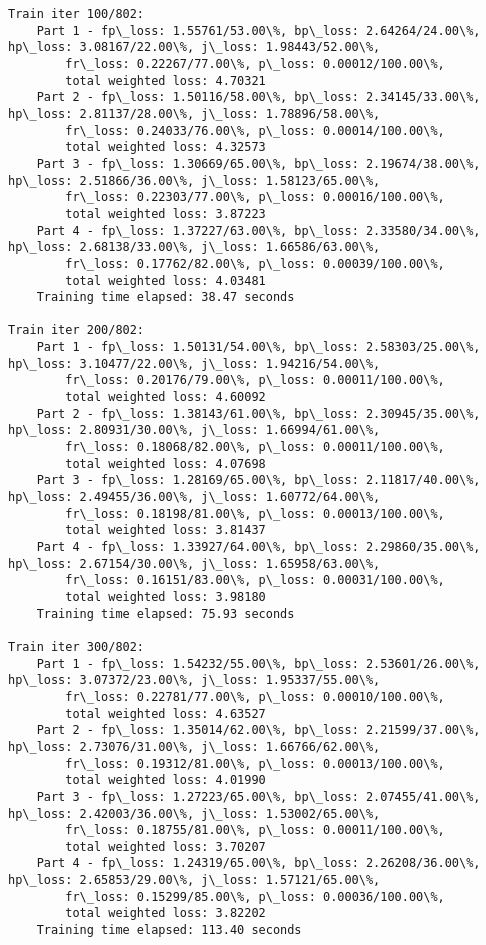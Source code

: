 \documentclass[11pt]{article}
\begin{document}
\begin{Verbatim}[commandchars=\\\{\}]
Train iter 100/802:
	Part 1 - fp\_loss: 1.55761/53.00\%, bp\_loss: 2.64264/24.00\%, hp\_loss: 3.08167/22.00\%, j\_loss: 1.98443/52.00\%, 
		fr\_loss: 0.22267/77.00\%, p\_loss: 0.00012/100.00\%, 
		total weighted loss: 4.70321
	Part 2 - fp\_loss: 1.50116/58.00\%, bp\_loss: 2.34145/33.00\%, hp\_loss: 2.81137/28.00\%, j\_loss: 1.78896/58.00\%, 
		fr\_loss: 0.24033/76.00\%, p\_loss: 0.00014/100.00\%, 
		total weighted loss: 4.32573
	Part 3 - fp\_loss: 1.30669/65.00\%, bp\_loss: 2.19674/38.00\%, hp\_loss: 2.51866/36.00\%, j\_loss: 1.58123/65.00\%, 
		fr\_loss: 0.22303/77.00\%, p\_loss: 0.00016/100.00\%, 
		total weighted loss: 3.87223
	Part 4 - fp\_loss: 1.37227/63.00\%, bp\_loss: 2.33580/34.00\%, hp\_loss: 2.68138/33.00\%, j\_loss: 1.66586/63.00\%, 
		fr\_loss: 0.17762/82.00\%, p\_loss: 0.00039/100.00\%, 
		total weighted loss: 4.03481
	Training time elapsed: 38.47 seconds

Train iter 200/802:
	Part 1 - fp\_loss: 1.50131/54.00\%, bp\_loss: 2.58303/25.00\%, hp\_loss: 3.10477/22.00\%, j\_loss: 1.94216/54.00\%, 
		fr\_loss: 0.20176/79.00\%, p\_loss: 0.00011/100.00\%, 
		total weighted loss: 4.60092
	Part 2 - fp\_loss: 1.38143/61.00\%, bp\_loss: 2.30945/35.00\%, hp\_loss: 2.80931/30.00\%, j\_loss: 1.66994/61.00\%, 
		fr\_loss: 0.18068/82.00\%, p\_loss: 0.00011/100.00\%, 
		total weighted loss: 4.07698
	Part 3 - fp\_loss: 1.28169/65.00\%, bp\_loss: 2.11817/40.00\%, hp\_loss: 2.49455/36.00\%, j\_loss: 1.60772/64.00\%, 
		fr\_loss: 0.18198/81.00\%, p\_loss: 0.00013/100.00\%, 
		total weighted loss: 3.81437
	Part 4 - fp\_loss: 1.33927/64.00\%, bp\_loss: 2.29860/35.00\%, hp\_loss: 2.67154/30.00\%, j\_loss: 1.65958/63.00\%, 
		fr\_loss: 0.16151/83.00\%, p\_loss: 0.00031/100.00\%, 
		total weighted loss: 3.98180
	Training time elapsed: 75.93 seconds

Train iter 300/802:
	Part 1 - fp\_loss: 1.54232/55.00\%, bp\_loss: 2.53601/26.00\%, hp\_loss: 3.07372/23.00\%, j\_loss: 1.95337/55.00\%, 
		fr\_loss: 0.22781/77.00\%, p\_loss: 0.00010/100.00\%, 
		total weighted loss: 4.63527
	Part 2 - fp\_loss: 1.35014/62.00\%, bp\_loss: 2.21599/37.00\%, hp\_loss: 2.73076/31.00\%, j\_loss: 1.66766/62.00\%, 
		fr\_loss: 0.19312/81.00\%, p\_loss: 0.00013/100.00\%, 
		total weighted loss: 4.01990
	Part 3 - fp\_loss: 1.27223/65.00\%, bp\_loss: 2.07455/41.00\%, hp\_loss: 2.42003/36.00\%, j\_loss: 1.53002/65.00\%, 
		fr\_loss: 0.18755/81.00\%, p\_loss: 0.00011/100.00\%, 
		total weighted loss: 3.70207
	Part 4 - fp\_loss: 1.24319/65.00\%, bp\_loss: 2.26208/36.00\%, hp\_loss: 2.65853/29.00\%, j\_loss: 1.57121/65.00\%, 
		fr\_loss: 0.15299/85.00\%, p\_loss: 0.00036/100.00\%, 
		total weighted loss: 3.82202
	Training time elapsed: 113.40 seconds


\end{Verbatim}
\end{document}
